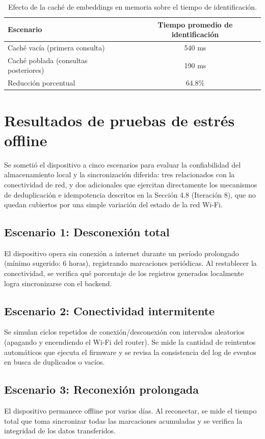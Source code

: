 \documentclass{iccmemoria}
\begin{document}
\begin{table}[H]
\centering
\begin{tabular}{|l|c|}
\hline
\textbf{Escenario} & \textbf{Tiempo promedio de identificación} \\
\hline
Caché vacía (primera consulta) & 540 ms \\
Caché poblada (consultas posteriores) & 190 ms \\
Reducción porcentual & 64.8\% \\
\hline
\end{tabular}
\caption{Efecto de la caché de embeddings en memoria sobre el tiempo de identificación.}
\label{tab:cache_embeddings}
\end{table}

\section{Resultados de pruebas de estrés offline}
Se sometió el dispositivo a cinco escenarios para evaluar la confiabilidad del almacenamiento local y la sincronización diferida: tres relacionados con la conectividad de red, y dos adicionales que ejercitan directamente los mecanismos de deduplicación e idempotencia descritos en la Sección 4.8 (Iteración 8), que no quedan cubiertos por una simple variación del estado de la red Wi-Fi.

\subsection{Escenario 1: Desconexión total}
El dispositivo opera sin conexión a internet durante un período prolongado (mínimo sugerido: 6 horas), registrando marcaciones periódicas. Al restablecer la conectividad, se verifica qué porcentaje de los registros generados localmente logra sincronizarse con el backend.

\subsection{Escenario 2: Conectividad intermitente}
Se simulan ciclos repetidos de conexión/desconexión con intervalos aleatorios (apagando y encendiendo el Wi-Fi del router). Se mide la cantidad de reintentos automáticos que ejecuta el firmware y se revisa la consistencia del log de eventos en busca de duplicados o vacíos.

\subsection{Escenario 3: Reconexión prolongada}
El dispositivo permanece offline por varios días. Al reconectar, se mide el tiempo total que toma sincronizar todas las marcaciones acumuladas y se verifica la integridad de los datos transferidos.
\end{document}
